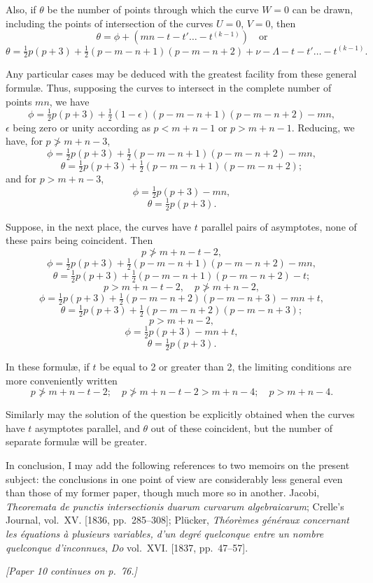 \documentclass[11pt]{article}
\begin{document}
Also, if $\theta$ be the number of points through which the curve $W = 0$ can be drawn, including the points of intersection of the curves $U = 0$, $V = 0$, then
\[
\theta = \phi + (mn - t - t' \ldots - t^{(k-1)})\quad\text{or}
\]
\[
\theta = \tfrac12 p(p + 3) + \tfrac12(p - m - n + 1)(p - m - n + 2) + \nu - \Lambda - t - t' \ldots - t^{(k-1)} \tag{13}.
\]

Any particular cases may be deduced with the greatest facility from these general formul\ae. Thus, supposing the curves to intersect in the complete number of points $mn$, we have
\[
\phi = \tfrac12 p(p + 3) + \tfrac12(1 - \epsilon)(p - m - n + 1)(p - m - n + 2) - mn,
\]
$\epsilon$ being zero or unity according as $p < m + n - 1$ or $p > m + n - 1$. Reducing, we have, for $p \not> m + n - 3$,
\[
\phi = \tfrac12 p(p + 3) + \tfrac12(p - m - n + 1)(p - m - n + 2) - mn,
\]
\[
\theta = \tfrac12 p(p + 3) + \tfrac12(p - m - n + 1)(p - m - n + 2);
\]
and for $p > m + n - 3$,
\[
\phi = \tfrac12 p(p + 3) - mn,
\]
\[
\theta = \tfrac12 p(p + 3).
\]

Suppose, in the next place, the curves have $t$ parallel pairs of asymptotes, none of these pairs being coincident. Then
\[
p \not> m + n - t - 2,
\]
\[
\phi = \tfrac12 p(p + 3) + \tfrac12(p - m - n + 1)(p - m - n + 2) - mn,
\]
\[
\theta = \tfrac12 p(p + 3) + \tfrac12(p - m - n + 1)(p - m - n + 2) - t;
\]
\[
p > m + n - t - 2,\quad p \not> m + n - 2,
\]
\[
\phi = \tfrac12 p(p + 3) + \tfrac12(p - m - n + 2)(p - m - n + 3) - mn + t,
\]
\[
\theta = \tfrac12 p(p + 3) + \tfrac12(p - m - n + 2)(p - m - n + 3);
\]
\[
p > m + n - 2,
\]
\[
\phi = \tfrac12 p(p + 3) - mn + t,
\]
\[
\theta = \tfrac12 p(p + 3).
\]

In these formul\ae, if $t$ be equal to 2 or greater than 2, the limiting conditions are more conveniently written
\[
p \not> m + n - t - 2;\quad p \not> m + n - t - 2 > m + n - 4;\quad p > m + n - 4.
\]

Similarly may the solution of the question be explicitly obtained when the curves have $t$ asymptotes parallel, and $\theta$ out of these coincident, but the number of separate formul\ae{} will be greater.

In conclusion, I may add the following references to two memoirs on the present subject: the conclusions in one point of view are considerably less general even than those of my former paper, though much more so in another. Jacobi, \textit{Theoremata de punctis intersectionis duarum curvarum algebraicarum}; Crelle's Journal, vol.~XV. [1836, pp.~285--308]; Pl\"ucker, \textit{Th\'eor\`emes g\'en\'eraux concernant les \'equations \`a plusieurs variables, d'un degr\'e quelconque entre un nombre quelconque d'inconnues}, \textit{Do} vol.~XVI. [1837, pp.~47--57].

\medskip
\noindent\textit{[Paper 10 continues on p.~76.]}
\end{document}
